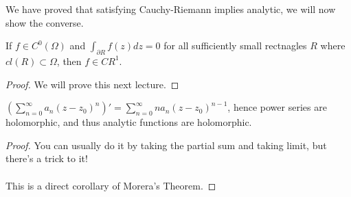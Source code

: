 We have proved that satisfying Cauchy-Riemann implies analytic, we will now show the converse.

\begin{theorem}
If $f \in C^0(\Omega)$ and $\int_{\partial R} f(z) dz = 0$ for all sufficiently small rectnagles $R$ where $cl(R) \subset \Omega$, then $f \in CR^1$.
\end{theorem}

\begin{proof}
We will prove this next lecture.
\end{proof}

\begin{theorem}
$(\sum_{n = 0}^\infty a_n (z - z_0)^n)' = \sum_{n = 0}^\infty n a_n (z - z_0)^{n-1}$, hence power series are holomorphic, and thus analytic functions are holomorphic.
\end{theorem}

\begin{proof}
You can usually do it by taking the partial sum and taking limit, but there's a trick to it!\\\\
This is a direct corollary of Morera's Theorem.
\end{proof}
